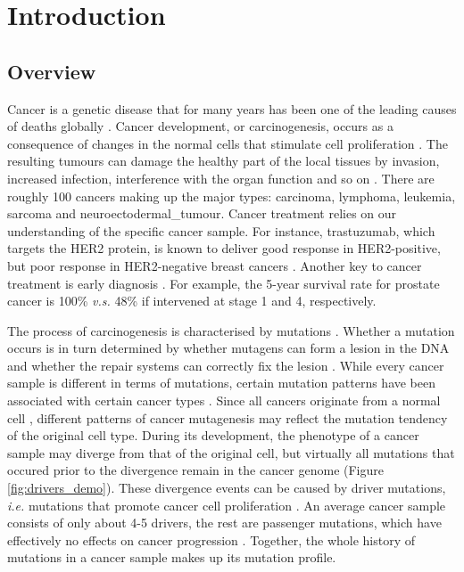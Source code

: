 \chapter{Introduction}\label{intro}

\section{Overview}

Cancer is a genetic disease that for many years has been one of the leading causes of deaths globally \citep{Bray2021TheWorldwide}. Cancer development, or carcinogenesis, occurs as a consequence of changes in the normal cells that stimulate cell proliferation \citep{Weinberg1996HowArises}. The resulting tumours can damage the healthy part of the local tissues by invasion, increased infection, interference with the organ function and so on \citep{Tobias2014CancerManagement}. There are roughly 100 cancers making up the major types: \gls{carcinoma}, \gls{lymphoma}, \gls{leukemia}, \gls{sarcoma} and \gls{neuroectodermal_tumour}. Cancer treatment relies on our understanding of the specific cancer sample. For instance, trastuzumab, which targets the HER2 protein, is known to deliver good response in HER2-positive, but poor response in HER2-negative breast cancers \citep{Kreutzfeldt2020TheTherapies}. Another key to cancer treatment is early diagnosis \citep{Hawkes2019CancerDiagnosis}. For example, the 5-year survival rate for prostate cancer is 100\% \textit{v.s.} 48\% if intervened at stage 1 and 4, respectively. 

The process of \gls{carcinogenesis} is characterised by mutations \citep{Stratton2009}. Whether a mutation occurs is in turn determined by whether mutagens can form a \gls{lesion} in the DNA and whether the repair systems can correctly fix the lesion \citep{Chatterjee2017MechanismsMutagenesis}. While every cancer sample is different in terms of mutations, certain mutation patterns have been associated with certain cancer types \citep{Alexandrov2013,Polak2015,Campbell2020}. Since all cancers originate from a normal cell \citep{Hanahan2011HallmarksGeneration}, different patterns of cancer \gls{mutagenesis} may reflect the mutation tendency of the original cell type. During its development, the phenotype of a cancer sample may diverge from that of the original cell, but virtually all mutations that occured prior to the divergence remain in the cancer genome (Figure \ref{fig:drivers_demo}). These divergence events can be caused by driver mutations, \textit{i.e.} mutations that promote cancer cell proliferation \citep{Pon2015}. An average cancer sample consists of only about 4-5 drivers, the rest are passenger mutations, which have effectively no effects on cancer progression \citep{Campbell2020}. Together, the whole history of mutations in a cancer sample makes up its mutation profile. 


